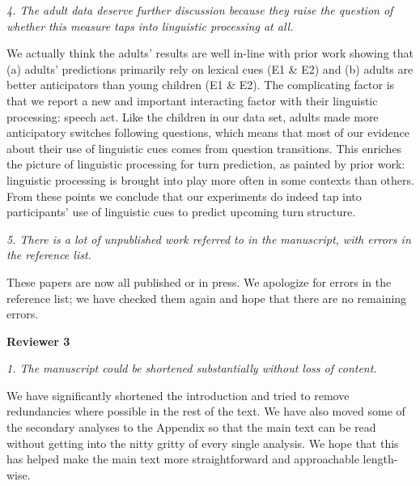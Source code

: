 \documentclass[11pt,a4paper]{letter} %
\begin{document}
\begin{letter}{}
\smallskip

\noindent \textit{4. The adult data deserve further discussion because they raise the question of whether this measure taps into linguistic processing at all.}

\noindent We actually think the adults' results are well in-line with prior work showing that (a) adults' predictions primarily rely on lexical cues (E1 \& E2) and (b) adults are better anticipators than young children (E1 \& E2). The complicating factor is that we report a new and important interacting factor with their linguistic processing: speech act. Like the children in our data set, adults made more anticipatory switches following questions, which means that most of our evidence about their use of linguistic cues comes from question transitions. This enriches the picture of linguistic processing for turn prediction, as painted by prior work: linguistic processing is brought into play more often in some contexts than others. From these points we conclude that our experiments do indeed tap into participants' use of linguistic cues to predict upcoming turn structure.

\smallskip

\noindent \textit{5. There is a lot of unpublished work referred to in the manuscript, with errors in the reference list.}

\noindent These papers are now all published or in press. We apologize for errors in the reference list; we have checked them again and hope that there are no remaining errors.

\bigskip

\noindent \textbf{Reviewer 3}

\noindent \textit{1. The manuscript could be shortened substantially without loss of content.}

\noindent We have significantly shortened the introduction and tried to remove redundancies where possible in the rest of the text. We have also moved some of the secondary analyses to the Appendix so that the main text can be read without getting into the nitty gritty of every single analysis. We hope that this has helped make the main text more straightforward and approachable length-wise.


\end{letter}
\end{document}
